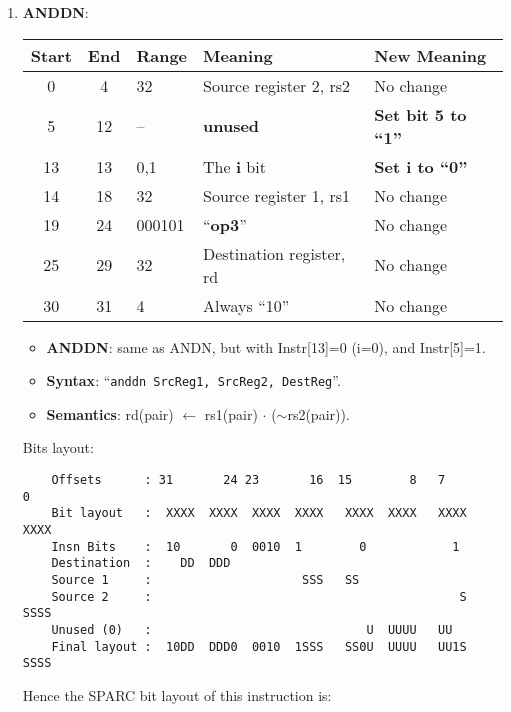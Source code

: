 \begin{enumerate}
\item \textbf{ANDDN}:\\
  \begin{center}
    \begin{tabular}[p]{|c|c|l|l|l|}
      \hline
      \textbf{Start} & \textbf{End} & \textbf{Range} & \textbf{Meaning} &
                                                                          \textbf{New Meaning}\\
      \hline
      0 & 4 & 32 & Source register 2, rs2 & No change \\
      5 & 12 & -- & \textbf{unused} & \textbf{Set bit 5 to ``1''} \\
      13 & 13 & 0,1 & The \textbf{i} bit & \textbf{Set i to ``0''} \\
      14 & 18 & 32 & Source register 1, rs1 & No change \\
      19 & 24 & 000101 & ``\textbf{op3}'' & No change \\
      25 & 29 & 32 & Destination register, rd & No change \\
      30 & 31 & 4 & Always ``10'' & No change \\
      \hline
    \end{tabular}
  \end{center}
  \begin{itemize}
  \item []\textbf{ANDDN}: same as ANDN, but with Instr[13]=0 (i=0), and
    Instr[5]=1.
  \item []\textbf{Syntax}: ``\texttt{anddn  SrcReg1, SrcReg2, DestReg}''.
  \item []\textbf{Semantics}: rd(pair) $\leftarrow$ rs1(pair) $\cdot$ ($\sim$rs2(pair)).
  \end{itemize}
  Bits layout:
\begin{verbatim}
    Offsets      : 31       24 23       16  15        8   7        0
    Bit layout   :  XXXX  XXXX  XXXX  XXXX   XXXX  XXXX   XXXX  XXXX
    Insn Bits    :  10       0  0010  1        0            1       
    Destination  :    DD  DDD                                       
    Source 1     :                     SSS   SS
    Source 2     :                                           S  SSSS
    Unused (0)   :                              U  UUUU   UU        
    Final layout :  10DD  DDD0  0010  1SSS   SS0U  UUUU   UU1S  SSSS
\end{verbatim}

  Hence the SPARC bit layout of this instruction is:


\end{enumerate}
